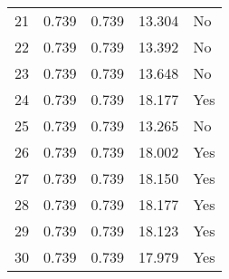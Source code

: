 \begin{tabular}{lrrll}
21 &                 0.739 &             0.739 &               13.304 &   No \\
22 &                 0.739 &             0.739 &               13.392 &   No \\
23 &                 0.739 &             0.739 &               13.648 &   No \\
24 &                 0.739 &             0.739 &               18.177 &  Yes \\
25 &                 0.739 &             0.739 &               13.265 &   No \\
26 &                 0.739 &             0.739 &               18.002 &  Yes \\
27 &                 0.739 &             0.739 &               18.150 &  Yes \\
28 &                 0.739 &             0.739 &               18.177 &  Yes \\
29 &                 0.739 &             0.739 &               18.123 &  Yes \\
30 &                 0.739 &             0.739 &               17.979 &  Yes \\
\bottomrule
\end{tabular}
